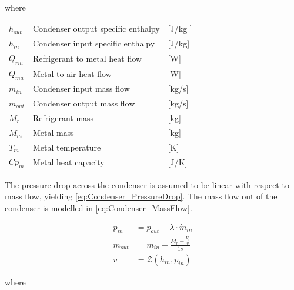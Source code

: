 where

\begin{center}
	\begin{tabular}{l p{8cm} l}
		$h_{out}$       & Condenser output specific enthalpy & [\si{J}/\si{kg} ] \\
		$h_{in}$        & Condenser input specific enthalpy  & [\si{J}/\si{kg}]  \\
		$Q_{rm}$        & Refrigerant to metal heat flow     & [\si{W}]          \\
		$Q_{ma}$        & Metal to air heat flow             & [\si{W}]          \\
		$\dot{m_{in}}$  & Condenser input mass flow          & [\si{kg}/\si{s}]  \\
		$\dot{m_{out}}$ & Condenser output mass flow         & [\si{kg}/\si{s}]  \\
		$M_r$           & Refrigerant mass                   & [\si{kg}]         \\
		$M_m$           & Metal mass                         & [\si{kg}]         \\
		$T_m$           & Metal temperature                  & [\si{K}]          \\
		$Cp_m$          & Metal heat capacity                & [\si{J}/\si{K}]
	\end{tabular}
\end{center}

The pressure drop across the condenser is assumed to be linear with respect to mass flow, yielding \cref{eq:Condenser_PressureDrop}.
The mass flow out of the condenser is modelled in \cref{eq:Condenser_MassFlow}.


\begin{align}
	p_{in} 	& =  p_{out} - \lambda \cdot \dot{m}_{in}  				\label{eq:Condenser_PressureDrop}\\
	\dot{m}_{out}		& = \dot{m}_{in} + \frac{M_r - \frac{V_i}{v}}{1s}		\label{eq:Condenser_MassFlow} \\
	v & = \mathcal{Z}(h_{in}, p_{in})
\end{align}

where

